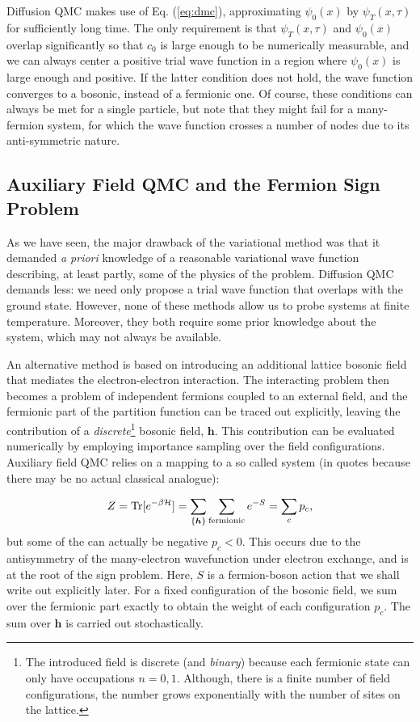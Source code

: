Diffusion \ac{QMC} makes use of Eq. (\ref{eq:dmc}), approximating $\psi_0(x)$ by $\psi_T (x, \tau)$ for sufficiently long time.
The only requirement is that $\psi_T (x, \tau)$ and $\psi_0(x)$ overlap significantly so that $c_0$ is large enough to be numerically measurable, and we can always center a positive trial wave function in a region where $\psi_0(x)$ is large enough and positive.
If the latter condition does not hold, the wave function converges to a bosonic, instead of a fermionic one.
Of course, these conditions can always be met for a single particle, but note that they might fail for a many-fermion system, for which the wave function crosses a number of nodes due to its anti-symmetric nature.

\subsection{Auxiliary Field \acs{QMC} and the Fermion Sign Problem}
\label{subsec:introAFQMC}

As we have seen, the major drawback of the variational method was that it demanded \emph{a priori} knowledge of a reasonable variational wave function describing, at least partly, some of the physics of the problem.
Diffusion \acs{QMC} demands less: we need only propose a trial wave function that overlaps with the ground state.
However, none of these methods allow us to probe systems at finite temperature.
Moreover, they both require some prior knowledge about the system, which may not always be available.

An alternative method is based on introducing an additional lattice bosonic field that mediates the electron-electron interaction.
The interacting problem then becomes a problem of independent fermions coupled to an external field, and the fermionic part of the partition function can be traced out explicitly, leaving the contribution of a \emph{discrete}\footnote{The introduced field is discrete (and \emph{binary}) because each fermionic state can only have occupations $n = 0, 1$. Although, there is a finite number of field configurations, the number grows exponentially with the number of sites on the lattice.} bosonic field, $\bm h$.
This contribution can be evaluated numerically by employing importance sampling over the field configurations.
Auxiliary field \acs{QMC} relies on a mapping to a so called  system (in quotes because there may be no actual classical analogue):

\begin{equation}\label{eq:Zsign}
Z = \operatorname{Tr} [ e^{-\beta \mathcal{H} } ] = \sum_{\{ \bm h\} } \sum_{\text{fermionic}} e^{-S} = \sum_c p_c ,
\end{equation}
but some of the  can actually be negative $p_c < 0$.
This occurs due to the antisymmetry of the many-electron wavefunction under electron exchange, and is at the root of the sign problem.
Here, $S$ is a fermion-boson action that we shall write out explicitly later.
For a fixed configuration of the bosonic field, we sum over the fermionic part exactly to obtain the weight of each configuration $p_c$.
The sum over $\bm h$ is carried out stochastically.

